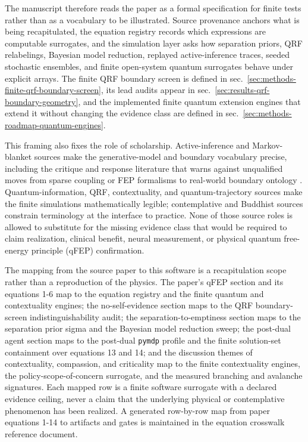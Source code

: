 \documentclass[
]{article}
\begin{document}
The manuscript therefore reads the paper as a formal specification for
finite tests rather than as a vocabulary to be illustrated. Source
provenance anchors what is being recapitulated, the equation registry
records which expressions are computable surrogates, and the simulation
layer asks how separation priors, QRF relabelings, Bayesian model
reduction, replayed active-inference traces, seeded stochastic
ensembles, and finite open-system quantum surrogates behave under
explicit arrays. The finite QRF boundary screen is defined in
sec.~\ref{sec:methods-finite-qrf-boundary-screen}, its lead audits
appear in sec.~\ref{sec:results-qrf-boundary-geometry}, and the
implemented finite quantum extension engines that extend it without
changing the evidence class are defined in
sec.~\ref{sec:methods-roadmap-quantum-engines}.

This framing also fixes the role of scholarship. Active-inference and
Markov-blanket sources make the generative-model and boundary vocabulary
precise, including the critique and response literature that warns
against unqualified moves from sparse coupling or FEP formalisms to
real-world boundary ontology
\citep{friston2023fep_simpler, aguilera2021particular, biehl2021technical_fep, heins2022sparse_coupling}.
Quantum-information, QRF, contextuality, and quantum-trajectory sources
make the finite simulations mathematically legible; contemplative and
Buddhist sources constrain terminology at the interface to practice.
None of those source roles is allowed to substitute for the missing
evidence class that would be required to claim realization, clinical
benefit, neural measurement, or physical quantum free-energy principle
(qFEP) confirmation.

The mapping from the source paper to this software is a recapitulation
scope rather than a reproduction of the physics. The paper's qFEP
section and its equations 1-6 map to the equation registry and the
finite quantum and contextuality engines; the no-self-evidence section
maps to the QRF boundary-screen indistinguishability audit; the
separation-to-emptiness section maps to the separation prior sigma and
the Bayesian model reduction sweep; the post-dual agent section maps to
the post-dual \texttt{pymdp} profile and the finite solution-set
containment over equations 13 and 14; and the discussion themes of
contextuality, compassion, and criticality map to the finite
contextuality engines, the policy-scope-of-concern surrogate, and the
measured branching and avalanche signatures. Each mapped row is a finite
software surrogate with a declared evidence ceiling, never a claim that
the underlying physical or contemplative phenomenon has been realized. A
generated row-by-row map from paper equations 1-14 to artifacts and
gates is maintained in the equation crosswalk reference document.
\end{document}
